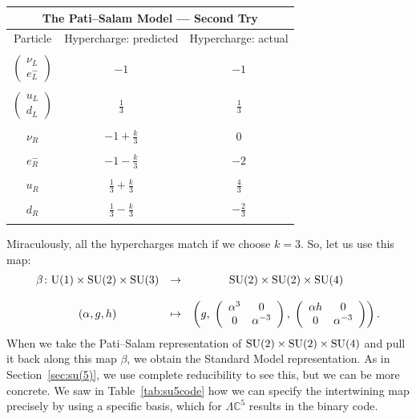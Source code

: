 \documentclass[12pt]{article}
\newcommand{\maps}{\colon}    %
\newcommand{\C}{{\mathbb C}}  %
\newcommand{\U}{{\rm U}}    %
\newcommand{\SU}{{\rm SU}}    %
\newcommand{\third}{\frac{1}{3}} %
\newcommand{\twothirds}{\frac{2}{3}} %
\newcommand{\fourthirds}{\frac{4}{3}} %
\newcommand{\lep}{\left( \! \begin{array}{c} \nu_L \\ e^-_L \end{array} \! \right)} %
\newcommand{\quark}{\left( \! \begin{array}{c} u_L \\ d_L \end{array} \! \right)} %
\begin{document}
\begin{table}[H]
	\renewcommand{\arraystretch}{0.8}
\begin{center}
	\begin{tabular}{ccc}
         \hline
	 \multicolumn{3}{|c|}{\bf{The Pati--Salam Model --- Second Try}} \\
         \hline
 Particle   & Hypercharge: predicted  & Hypercharge: actual \\  
\hline                              
\\
 $\lep$     & $-1$ & $-1$
\\    \\                                                               
 $\quark$   & $\third$ & $\third$  
\\     \\                                                               
 $\nu_R$    & $-1 + \frac{k}{3}$ & $0$
\\     \\                                                               
 $e^-_R$    & $-1 - \frac{k}{3}$  & $-2$    
\\     \\                                                               
 $u_R$      & $\third + \frac{k}{3}$ & $\fourthirds$
\\     \\                                                               
 $d_R$      & $\third - \frac{k}{3}$ &  $-\twothirds$          
\\    \\
         \hline                              
	\end{tabular}
	\vspace{-10pt}
\end{center}
	\renewcommand{\arraystretch}{1}
\end{table}

\noindent
Miraculously, all the hypercharges match if we choose $k = 3$.
So, let us use this map:
\[ \begin{array}{ccc}
\beta \maps \U(1) \times \SU(2) \times \SU(3) 
&\to& \SU(2) \times \SU(2) \times \SU(4) \\  \\
  (\alpha, g, h)  &\mapsto&  
\left( g, \;
\left(
\begin{array}{c c}
	\alpha^3 & 0 \\
	0 & \alpha^{-3}
\end{array}
\right), \;
\left(
\begin{array}{c c}
	\alpha h & 0 \\
	0 & \alpha^{-3}
\end{array}
\right) 
\right).
\end{array}
\]
When we take the Pati--Salam representation of 
$\SU(2) \times \SU(2) \times \SU(4)$
and pull it back along this map $\beta$, we obtain the Standard Model
representation. As in Section~\ref{sec:su(5)}, we use complete reducibility to
see this, but we can be more concrete. We saw in Table~\ref{tab:su5code} how we
can specify the intertwining map precisely by using a specific basis, which for
$\Lambda \C^5$ results in the binary code.
\end{document}

